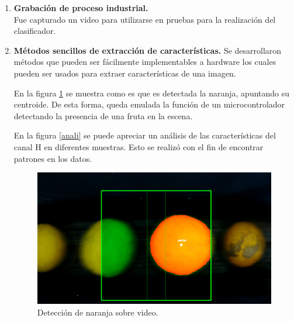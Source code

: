 \documentclass[twoside,spanish,ESP,MSc]{plantillaLabUPV}
\theoremstyle{definition}
\begin{document}
\begin{enumerate}
\begin{enumerate}
	\item \textbf{Grabación de proceso industrial.}\\Fue capturado un video para utilizarse en pruebas para la realización del clasificador.
	
	
	\item \textbf{Métodos sencillos de extracción de características.} Se desarrollaron métodos que pueden ser fácilmente implementables a hardware los cuales pueden ser usados para extraer características de una imagen. 
	
	En la figura \ref{framito} se muestra como es que es detectada la naranja, apuntando su centroide. De esta forma, queda emulada la función de un microcontrolador detectando la presencia de una fruta en la escena. 
	
	En la figura \ref{anali} se puede apreciar un análisis de las características del canal H en diferentes muestras. Esto se realizó con el fin de encontrar patrones en los datos.
	
	\begin{figure}[!h]
		\centering
		\includegraphics*[scale=0.30]{framito} 
		\caption{Detección de naranja sobre video.}
		\label{framito}
	\end{figure}
	
	\newcommand{\sis}{0.37}
	

\end{enumerate}
\end{enumerate}
\end{document}
